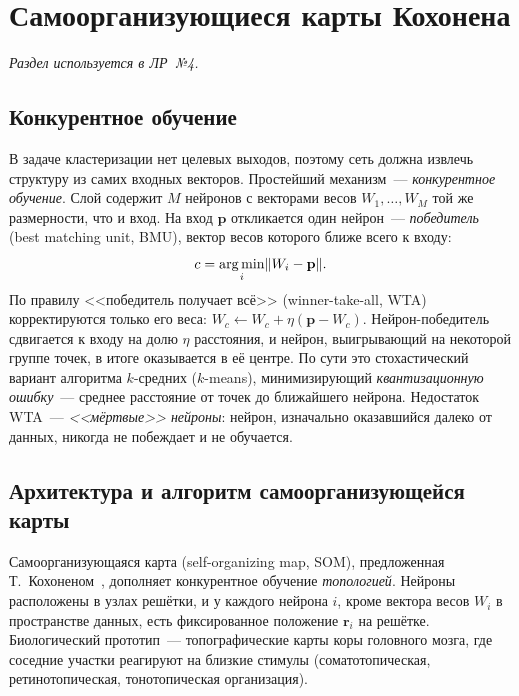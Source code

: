 \section{Самоорганизующиеся карты Кохонена}
\label{sec:som}

\noindent\hspace{1.25cm}\emph{Раздел используется в ЛР~№4.}

\subsection{Конкурентное обучение}

В задаче кластеризации нет целевых выходов, поэтому сеть должна извлечь структуру из самих входных
векторов. Простейший механизм~--- \emph{конкурентное обучение}. Слой содержит $M$ нейронов с векторами
весов $W_1, \ldots, W_M$ той же размерности, что и вход. На вход $\mathbf{p}$ откликается один нейрон~---
\emph{победитель} (best matching unit, BMU), вектор весов которого ближе всего к входу:
\begin{equation}
\label{eq:bmu}
c = \operatorname*{arg\,min}_{i} \lVert W_i - \mathbf{p}\rVert .
\end{equation}
По правилу <<победитель получает всё>> (winner-take-all, WTA) корректируются только его веса:
$W_c \leftarrow W_c + \eta(\mathbf{p} - W_c)$. Нейрон-победитель сдвигается к входу на долю $\eta$
расстояния, и нейрон, выигрывающий на некоторой группе точек, в итоге оказывается в её центре. По сути
это стохастический вариант алгоритма $k$-средних ($k$-means), минимизирующий \emph{квантизационную
ошибку}~--- среднее расстояние от точек до ближайшего нейрона. Недостаток WTA~--- \emph{<<мёртвые>>
нейроны}: нейрон, изначально оказавшийся далеко от данных, никогда не побеждает и не обучается.

\subsection{Архитектура и алгоритм самоорганизующейся карты}

Самоорганизующаяся карта (self-organizing map, SOM), предложенная Т.~Кохоненом~\cite{kohonen2008},
дополняет конкурентное обучение \emph{топологией}. Нейроны расположены в узлах решётки, и у каждого
нейрона $i$, кроме вектора весов $W_i$ в пространстве данных, есть фиксированное положение $\mathbf{r}_i$
на решётке. Биологический прототип~--- топографические карты коры головного мозга, где соседние участки
реагируют на близкие стимулы (соматотопическая, ретинотопическая, тонотопическая организация).

